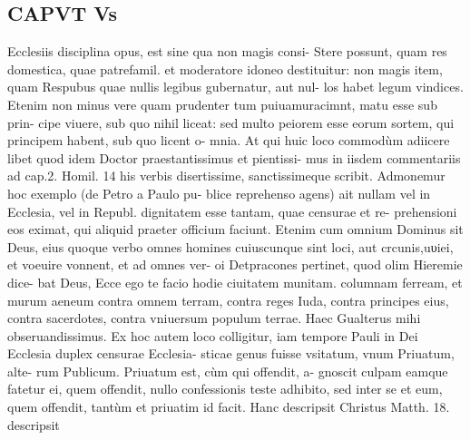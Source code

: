 \documentclass{article}
\begin{document}
\begin{pages}
\section*{CAPVT  Vs }
\marginpar{[ p.319 ]}\pstart Ecclesiis disciplina opus, est sine qua non magis consi- Stere possunt, quam res domestica, quae patrefamil. et moderatore idoneo destituitur: non magis item, quam Respubus  quae nullis legibus gubernatur, aut nul- los habet legum vindices. Etenim non minus vere quam prudenter tum puiuamuracimnt, matu esse sub prin- cipe viuere, sub quo nihil liceat: sed multo peiorem esse eorum sortem, qui principem habent, sub quo licent o- mnia. At qui huic loco commodùm adiicere libet quod idem Doctor praestantissimus et pientissi- mus in iisdem commentariis ad cap.2. Homil. 14 his verbis disertissime, sanctissimeque scribit. Admonemur hoc exemplo (de Petro a Paulo pu- blice reprehenso agens) ait nullam vel in Ecclesia, vel in Republ. dignitatem esse tantam, quae censurae et re- prehensioni eos eximat, qui aliquid praeter officium faciunt. Etenim cum omnium Dominus sit Deus, eius quoque verbo omnes homines cuiuscunque  sint loci, aut crcunis,uυiei, et voeuire vonnent, et ad omnes ver- oi Detpracones pertinet, quod olim Hieremie dice- bat Deus, Ecce ego te facio hodie ciuitatem munitam. columnam ferream, et murum aeneum contra omnem terram, contra reges Iuda, contra principes eius, contra sacerdotes, contra vniuersum populum terrae.  \pend\pstart Haec Gualterus mihi obseruandissimus.  \pend\pstart Ex hoc autem loco colligitur, iam tempore Pauli in Dei Ecclesia duplex censurae Ecclesia- sticae genus fuisse vsitatum, vnum Priuatum, alte- rum Publicum. Priuatum est, cùm qui offendit, a- gnoscit culpam eamque fatetur ei, quem offendit, nullo confessionis teste adhibito, sed inter se et eum, quem offendit, tantùm et priuatim id facit. Hanc descripsit Christus Matth. 18. descripsit  \pend

\end{pages}
\end{document}
